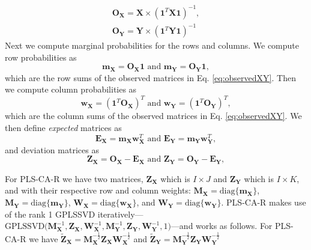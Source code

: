 \documentclass[12pt]{article}
\begin{document}
\begin{equation}
\begin{aligned}
{\mathbf O}_{\mathbf X} = {\mathbf X} \times ({\mathbf 1}^{T}{\mathbf X} {\mathbf 1})^{-1}, \\
{\mathbf O}_{\mathbf Y} = {\mathbf Y} \times ({\mathbf 1}^{T}{\mathbf Y} {\mathbf 1})^{-1}
\label{eq:observedXY}
\end{aligned}
\end{equation} Next we compute marginal probabilities for the rows and
columns. We compute row probabilities as \begin{equation}
{\mathbf m}_{\mathbf X} = {\mathbf O}_{\mathbf X}{\mathbf 1} \text{ and } {\mathbf m}_{\mathbf Y} = {\mathbf O}_{\mathbf Y}{\mathbf 1},
\label{eq:xy_rowvecs}
\end{equation} which are the row sums of the observed matrices in Eq.
\ref{eq:observedXY}. Then we compute column probabilities as
\begin{equation}
{\mathbf w}_{\mathbf X} = ({\mathbf 1}^{T}{\mathbf O}_{\mathbf X})^{T} \text{ and } {\mathbf w}_{\mathbf Y} = ({\mathbf 1}^{T}{\mathbf O}_{\mathbf Y})^{T},
\label{eq:weightmats_v1}
\end{equation} which are the column sums of the observed matrices in Eq.
\ref{eq:observedXY}. We then define \emph{expected} matrices as
\begin{equation}
{\mathbf E}_{\mathbf X} = {\mathbf m}_{\mathbf X}{\mathbf w}_{\mathbf X}^{T} \text{ and } {\mathbf E}_{\mathbf Y} = {\mathbf m}_{\mathbf Y}{\mathbf w}_{\mathbf Y}^{T},
\label{eq:models}
\end{equation} and deviation matrices as \begin{equation}
{\mathbf Z}_{\mathbf X} = {\mathbf O}_{\mathbf X} - {\mathbf E}_{\mathbf X} \text{ and } {\mathbf Z}_{\mathbf Y} = {\mathbf O}_{\mathbf Y} - {\mathbf E}_{\mathbf Y},
\label{eq:plscar_Zs}
\end{equation}

For PLS-CA-R we have two matrices, \({\mathbf Z}_{\mathbf X}\) which is
\(I \times J\) and \({\mathbf Z}_{\mathbf Y}\) which is \(I \times K\),
and with their respective row and column weights:
\({\mathbf M}_{\mathbf X} = \mathrm{diag\{}{\mathbf m}_{\mathbf X} \mathrm{\}}\),
\({\mathbf M}_{\mathbf Y} = \mathrm{diag\{}{\mathbf m}_{\mathbf Y} \mathrm{\}}\),
\({\mathbf W}_{\mathbf X} = \mathrm{diag\{}{\mathbf w}_{\mathbf X} \mathrm{\}}\),
and
\({\mathbf W}_{\mathbf Y} = \mathrm{diag\{}{\mathbf w}_{\mathbf Y} \mathrm{\}}\).
PLS-CA-R makes use of the rank 1 GPLSSVD
iteratively---\(\mathrm{GPLSSVD(} {\mathbf M}_{\mathbf X}^{-1}, {\mathbf Z}_{\mathbf X}, {\mathbf W}_{\mathbf X}^{-1}, {\mathbf M}_{\mathbf Y}^{-1}, {\mathbf Z}_{\mathbf Y}, {\mathbf W}_{\mathbf Y}^{-1}, 1 \mathrm{)}\)---and
works as follows. For PLS-CA-R we have
\(\widetilde{{\mathbf Z}}_{\mathbf X} = {\mathbf M}_{\mathbf X}^{-\frac{1}{2}}{\mathbf Z}_{\mathbf X}{\mathbf W}_{\mathbf X}^{-\frac{1}{2}}\)
and
\(\widetilde{{\mathbf Z}}_{\mathbf Y} = {\mathbf M}_{\mathbf Y}^{-\frac{1}{2}}{\mathbf Z}_{\mathbf Y}{\mathbf W}_{\mathbf Y}^{-\frac{1}{2}}\)
\end{document}
